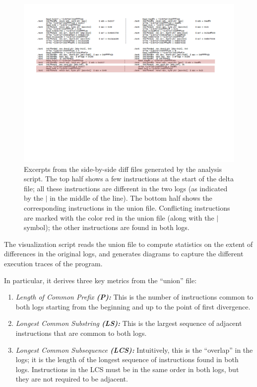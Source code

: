 \begin{figure}[h]
  \center
  \includegraphics[scale=0.64, trim=5cm 10cm 5cm 0cm]{log2.pdf}
  \caption[Excerpts from the side-by-side diff files generated by the analysis script]%
          {Excerpts from the side-by-side diff files generated by the analysis script.
            The top half shows a few instructions at the start of the delta file;
            all these instructions are different in the two logs (as
            indicated by the $\vert$ in the middle of the line).
            The bottom half shows the corresponding instructions in the union file.
            Conflicting instructions are marked with the color red in the 
            union file (along with the $\vert$ symbol); the other instructions are found in both logs.}
  \label{hw:logsys2}
\end{figure}

\newpage
{} \newline
The visualization script reads the union file to 
compute statistics on the extent of differences in the
original logs, and generates diagrams to 
capture the different execution traces of the program.
 
In particular, it derives three key metrics
from the ``union'' file:
\begin{enumerate}
\item {\em Length of Common Prefix {\bf (P):}} This is 
the number of instructions common
to both logs starting from the beginning
and up to the point of first divergence.
\item {\em Longest Common Substring {\bf (LS):}}
This is the largest sequence of adjacent instructions 
that are common to both logs.
\item {\em Longest Common Subsequence {\bf (LCS):}}
Intuitively, this is the ``overlap'' in the logs;
it is the length of the longest sequence of instructions
found in both logs. Instructions in the LCS must be in the same order
in both logs, but they are not required to be adjacent.
\end{enumerate}

